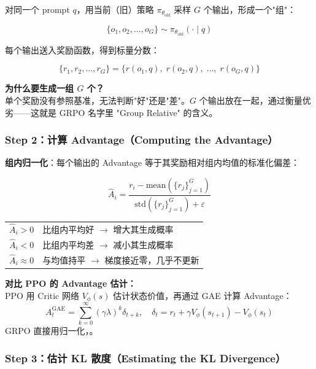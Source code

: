 对同一个 prompt $q$，用当前（旧）策略 $\pi_{\theta_\text{old}}$ 采样 $G$ 个输出，形成一个"组"：

\[
\{o_1, o_2, \ldots, o_G\} \sim \pi_{\theta_\text{old}}(\cdot \mid q)
\]

每个输出送入奖励函数，得到标量分数：

\[
\{r_1, r_2, \ldots, r_G\} = \{r(o_1, q),\; r(o_2, q),\; \ldots,\; r(o_G, q)\}
\]

\begin{intubox}
\textbf{为什么要生成一组 $G$ 个？}\\
单个奖励没有参照基准，无法判断"好"还是"差"。$G$ 个输出放在一起，通过衡量优劣——这就是 GRPO 名字里 "Group Relative" 的含义。
\end{intubox}

\subsubsection{Step 2：计算 Advantage（Computing the Advantage）}

\textbf{组内归一化}：每个输出的 Advantage 等于其奖励相对组内均值的标准化偏差：

\[
\hat{A}_i = \frac{r_i - \mathrm{mean}(\{r_j\}_{j=1}^G)}{\mathrm{std}(\{r_j\}_{j=1}^G) + \varepsilon}
\]

\begin{center}
\begin{tabular}{p{3cm}p{10cm}}
\hline
$\hat{A}_i > 0$ & 比组内平均好 $\to$ 增大其生成概率 \\
$\hat{A}_i < 0$ & 比组内平均差 $\to$ 减小其生成概率 \\
$\hat{A}_i \approx 0$ & 与均值持平 $\to$ 梯度接近零，几乎不更新 \\
\hline
\end{tabular}
\end{center}

\begin{warnbox}
\textbf{对比 PPO 的 Advantage 估计：}\\
PPO 用 Critic 网络 $V_\phi(s)$ 估计状态价值，再通过 GAE 计算 Advantage：
\[
A_t^\text{GAE} = \sum_{k=0}^\infty (\gamma\lambda)^k \delta_{t+k}, \quad \delta_t = r_t + \gamma V_\phi(s_{t+1}) - V_\phi(s_t)
\]
GRPO 直接用归一化，。
\end{warnbox}

\subsubsection{Step 3：估计 KL 散度（Estimating the KL Divergence）}

